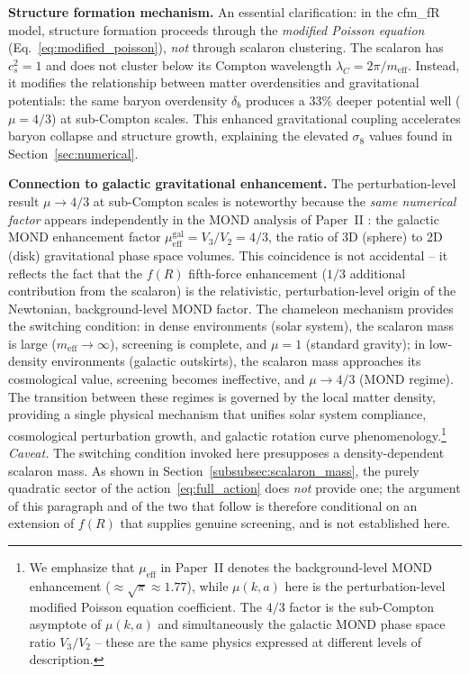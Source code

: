 \documentclass[aps,prd,twocolumn,superscriptaddress,nofootinbib]{revtex4-2}
\begin{document}
\textbf{Structure formation mechanism.} An essential clarification: in the cfm\_fR model, structure formation proceeds through the \textit{modified Poisson equation} (Eq.~\ref{eq:modified_poisson}), \textit{not} through scalaron clustering. The scalaron has $c_s^2 = 1$ and does not cluster below its Compton wavelength $\lambda_C = 2\pi/m_{\mathrm{eff}}$. Instead, it modifies the relationship between matter overdensities and gravitational potentials: the same baryon overdensity $\delta_b$ produces a $33\%$ deeper potential well ($\mu = 4/3$) at sub-Compton scales. This enhanced gravitational coupling accelerates baryon collapse and structure growth, explaining the elevated $\sigma_8$ values found in Section~\ref{sec:numerical}.

\textbf{Connection to galactic gravitational enhancement.} The perturbation-level result $\mu \to 4/3$ at sub-Compton scales is noteworthy because the \textit{same numerical factor} appears independently in the MOND analysis of Paper~II \cite{Geiger2026b}: the galactic MOND enhancement factor $\mu_{\mathrm{eff}}^{\mathrm{gal}} = V_3/V_2 = 4/3$, the ratio of 3D (sphere) to 2D (disk) gravitational phase space volumes. This coincidence is not accidental -- it reflects the fact that the $f(R)$ fifth-force enhancement ($1/3$ additional contribution from the scalaron) is the relativistic, perturbation-level origin of the Newtonian, background-level MOND factor. The chameleon mechanism provides the switching condition: in dense environments (solar system), the scalaron mass is large ($m_{\mathrm{eff}} \to \infty$), screening is complete, and $\mu = 1$ (standard gravity); in low-density environments (galactic outskirts), the scalaron mass approaches its cosmological value, screening becomes ineffective, and $\mu \to 4/3$ (MOND regime). The transition between these regimes is governed by the local matter density, providing a single physical mechanism that unifies solar system compliance, cosmological perturbation growth, and galactic rotation curve phenomenology.\footnote{We emphasize that $\mu_{\mathrm{eff}}$ in Paper~II denotes the background-level MOND enhancement ($\approx \sqrt{\pi} \approx 1.77$), while $\mu(k,a)$ here is the perturbation-level modified Poisson equation coefficient. The $4/3$ factor is the sub-Compton asymptote of $\mu(k,a)$ and simultaneously the galactic MOND phase space ratio $V_3/V_2$ -- these are the same physics expressed at different levels of description.} \textit{Caveat.} The switching condition invoked here presupposes a density-dependent scalaron mass. As shown in Section~\ref{subsubsec:scalaron_mass}, the purely quadratic sector of the action~\eqref{eq:full_action} does \textit{not} provide one; the argument of this paragraph and of the two that follow is therefore conditional on an extension of $f(R)$ that supplies genuine screening, and is not established here.
\end{document}
